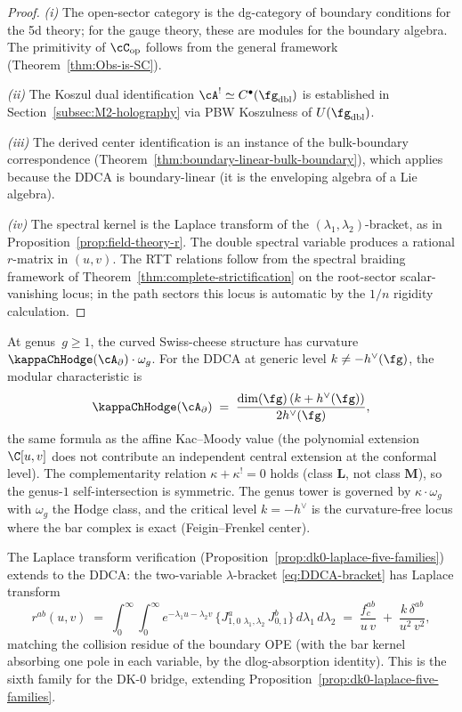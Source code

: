 \begin{proof}
\emph{(i)} The open-sector category is the dg-category
of boundary conditions for the 5d theory; for the gauge
theory, these are modules for the boundary algebra.
The primitivity of $\cC_{\mathrm{op}}$ follows from
the general framework
(Theorem~\ref{thm:Obs-is-SC}).

\emph{(ii)} The Koszul dual identification
$\cA^! \simeq C^\bullet(\fg_{\mathrm{dbl}})$
is established in Section~\ref{subsec:M2-holography}
via PBW Koszulness of $U(\fg_{\mathrm{dbl}})$.

\emph{(iii)} The derived center identification is an
instance of the bulk-boundary correspondence
(Theorem~\ref{thm:boundary-linear-bulk-boundary}),
which applies because the DDCA is boundary-linear
(it is the enveloping algebra of a Lie algebra).

\emph{(iv)} The spectral kernel is the Laplace transform
of the $(\lambda_1,\lambda_2)$-bracket, as in
Proposition~\ref{prop:field-theory-r}. The double
spectral variable produces a rational $r$-matrix in
$(u,v)$. The RTT relations follow from the spectral
braiding framework of
Theorem~\ref{thm:complete-strictification} on the root-sector
scalar-vanishing locus; in the path sectors this locus is automatic
by the $1/n$ rigidity calculation.
\end{proof}

\begin{remark}
\label{rem:DDCA-genus}
At genus~$g \ge 1$, the curved Swiss-cheese structure
has curvature $\kappaChHodge(\cA_\partial) \cdot \omega_g$.
For the DDCA at generic level $k \ne -h^\vee(\fg)$,
the modular characteristic is
\[
 \kappaChHodge(\cA_\partial)
 \;=\;
 \frac{\dim(\fg)\,(k + h^\vee(\fg))}{2h^\vee(\fg)},
\]
the same formula as the affine Kac--Moody value
\textup{(}the polynomial extension $\C[u,v]$ does not
contribute an independent central extension at the
conformal level\textup{)}. The
complementarity relation
$\kappa + \kappa^! = 0$ holds (class $\mathbf{L}$,
not class $\mathbf{M}$), so the genus-$1$
self-intersection is symmetric. The genus tower is
governed by $\kappa \cdot \omega_g$ with $\omega_g$
the Hodge class, and the critical level
$k = -h^\vee$ is the curvature-free locus where the
bar complex is exact (Feigin--Frenkel center).
\end{remark}

\begin{remark}
\label{rem:DDCA-DK0}
The Laplace transform verification
(Proposition~\ref{prop:dk0-laplace-five-families}) extends
to the DDCA: the two-variable $\lambda$-bracket
\eqref{eq:DDCA-bracket} has Laplace transform
\[
 r^{ab}(u,v)
 \;=\;
 \int_0^\infty \int_0^\infty
 e^{-\lambda_1 u - \lambda_2 v}\,
 \{J^a_{1,0}\,{}_{\lambda_1,\lambda_2}\,J^b_{0,1}\}\,
 d\lambda_1\, d\lambda_2
 \;=\;
 \frac{f^{ab}_c}{u\,v}
 \;+\;
 \frac{k\,\delta^{ab}}{u^2\, v^2},
\]
matching the collision residue of the boundary OPE
(with the bar kernel absorbing one pole in each
variable, by the dlog-absorption identity). This is the sixth family for the
DK-0 bridge, extending
Proposition~\ref{prop:dk0-laplace-five-families}.
\end{remark}

